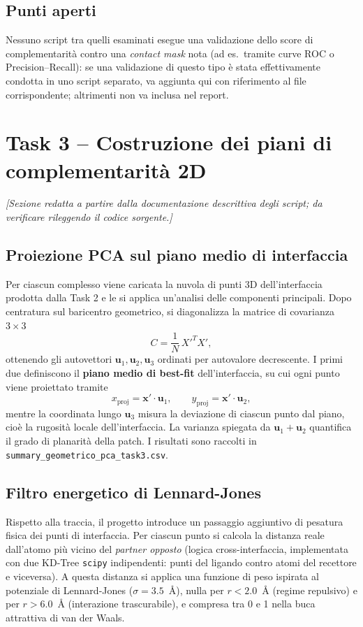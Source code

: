 \documentclass[11pt,a4paper]{article}
\begin{document}
\subsection{Punti aperti}
Nessuno script tra quelli esaminati esegue una validazione dello score di complementarità contro una \emph{contact mask} nota (ad es.\ tramite curve ROC o Precision--Recall): se una validazione di questo tipo è stata effettivamente condotta in uno script separato, va aggiunta qui con riferimento al file corrispondente; altrimenti non va inclusa nel report.

\section{Task 3 -- Costruzione dei piani di complementarità 2D}
\label{sec:task3}

\emph{[Sezione redatta a partire dalla documentazione descrittiva degli script; da verificare rileggendo il codice sorgente.]}

\subsection{Proiezione PCA sul piano medio di interfaccia}
Per ciascun complesso viene caricata la nuvola di punti 3D dell'interfaccia prodotta dalla Task 2 e le si applica un'analisi delle componenti principali. Dopo centratura sul baricentro geometrico, si diagonalizza la matrice di covarianza $3\times3$
\[
C = \frac{1}{N}\,X'^{T}X' ,
\]
ottenendo gli autovettori $\mathbf{u}_1,\mathbf{u}_2,\mathbf{u}_3$ ordinati per autovalore decrescente. I primi due definiscono il \textbf{piano medio di best-fit} dell'interfaccia, su cui ogni punto viene proiettato tramite
\[
x_{\text{proj}} = \mathbf{x}'\cdot\mathbf{u}_1, \qquad
y_{\text{proj}} = \mathbf{x}'\cdot\mathbf{u}_2 ,
\]
mentre la coordinata lungo $\mathbf{u}_3$ misura la deviazione di ciascun punto dal piano, cioè la rugosità locale dell'interfaccia. La varianza spiegata da $\mathbf{u}_1+\mathbf{u}_2$ quantifica il grado di planarità della patch. I risultati sono raccolti in \texttt{summary\_geometrico\_pca\_task3.csv}.

\subsection{Filtro energetico di Lennard-Jones}
Rispetto alla traccia, il progetto introduce un passaggio aggiuntivo di pesatura fisica dei punti di interfaccia. Per ciascun punto si calcola la distanza reale dall'atomo più vicino del \emph{partner opposto} (logica cross-interfaccia, implementata con due KD-Tree \texttt{scipy} indipendenti: punti del ligando contro atomi del recettore e viceversa). A questa distanza si applica una funzione di peso ispirata al potenziale di Lennard-Jones ($\sigma = 3.5$~\r{A}), nulla per $r < 2.0$~\r{A} (regime repulsivo) e per $r > 6.0$~\r{A} (interazione trascurabile), e compresa tra 0 e 1 nella buca attrattiva di van der Waals.
\end{document}
